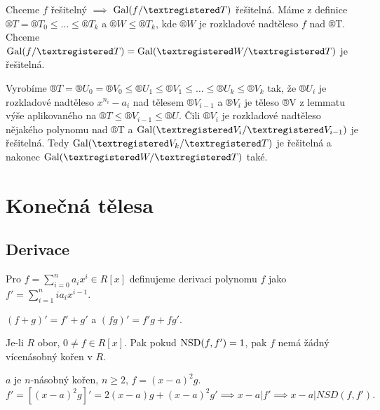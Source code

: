 \documentclass[12pt]{article}                   %
\begin{document}
\begin{dukaz}
        Chceme $f$ řešitelný $\implies$ $\Gal(f/®T)$ řešitelná. Máme z definice $®T = ®T_0≤…≤®T_k$ a $®W ≤ ®T_k$, kde $®W$ je rozkladové nadtěleso $f$ nad ®T. Chceme $\Gal(f/®T)=\Gal(®W/®T)$ je řešitelná.

        Vyrobíme $®T=®U_0=®V_0 ≤ ®U_1 ≤ ®V_1 ≤ … ≤ ®U_k ≤ ®V_k$ tak, že $®U_i$ je rozkladové nadtěleso $x^{n_i}-a_i$ nad tělesem $®V_{i-1}$ a $®V_i$ je těleso ®V z lemmatu výše aplikovaného na $®T ≤ ®V_{i-1}≤®U$. Čili $®V_i$ je rozkladové nadtěleso nějakého polynomu nad ®T a $\Gal(®V_i/®V_{i-1})$ je řešitelná. Tedy $\Gal(®V_k/®T)$ je řešitelná a nakonec $\Gal(®W/®T)$ také.
    \end{dukaz}


\section{Konečná tělesa}
    \subsection{Derivace}
        \begin{definice}
            Pro $f=\sum_{i=0}^n a_ix^i \in R[x]$ definujeme derivaci polynomu $f$ jako $f'=\sum_{i=1}^n i a_i x^{i-1}$.
        \end{definice}

        \begin{lemma}[Cvičení]
            $(f+g)'=f'+g'$ a $(fg)'=f'g+fg'$.
        \end{lemma}

        \begin{dusledek}
            Je-li $R$ obor, $0≠f \in R[x]$. Pak pokud $\operatorname{NSD}(f,f')=1$, pak $f$ nemá žádný vícenásobný kořen v $R$.

            \begin{dukazin}
                $a$ je $n$-násobný kořen, $n≥2$, $f=(x-a)^2g$.
                $$ f'=[(x-a)^2 g]' = 2(x-a)g + (x-a)^2g' \implies x-a | f' \implies x-a|NSD(f,f'). $$ 
            \end{dukazin}
        \end{dusledek}
\end{document}
